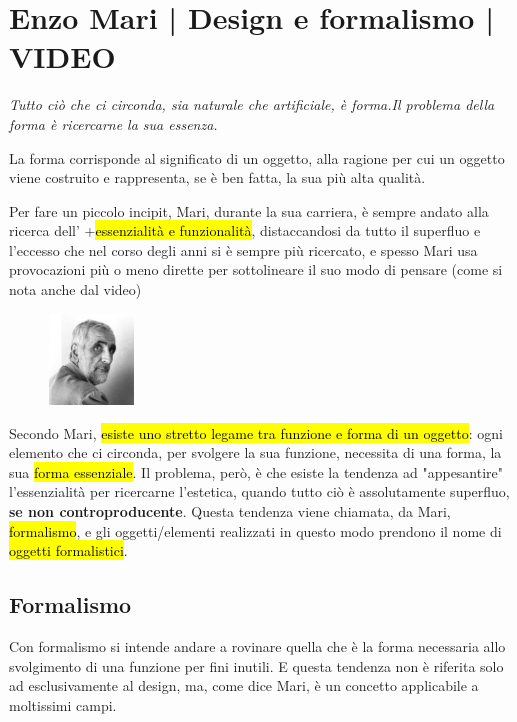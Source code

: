 \section{Enzo Mari | Design e formalismo | VIDEO}\label{sec-mari}
\begin{fancyquotes}
{\huge \textit{Tutto ciò che ci circonda, sia naturale che artificiale, è forma.Il problema della forma è ricercarne la sua essenza.} }

    
    La forma corrisponde al significato di un oggetto, alla ragione per cui un oggetto viene costruito e rappresenta, se è ben fatta, la sua più alta qualità. 
\end{fancyquotes}

Per fare un piccolo incipit, Mari, durante la sua carriera, è sempre andato alla ricerca dell' +\hl{essenzialità e funzionalità}, distaccandosi da tutto il superfluo e l'eccesso che nel corso degli anni si è sempre più ricercato, e spesso Mari usa provocazioni più o meno dirette per sottolineare il suo modo di pensare (come si nota anche dal video)  



\begin{figure} %
    \includegraphics[width=0.2\textwidth]{lezione_1-introduzione al corso/imgs/mari.jpg}
\end{figure}
Secondo Mari, \hl{esiste uno stretto legame tra funzione e forma di un oggetto}: ogni elemento che ci circonda, per svolgere la sua funzione, necessita di una forma, la sua \hl{forma essenziale}.
Il problema, però, è che esiste la tendenza ad "appesantire" l'essenzialità per ricercarne l'estetica, quando tutto ciò è assolutamente superfluo, \textbf{se non controproducente}.
Questa tendenza viene chiamata, da Mari, \hl{formalismo}, e gli oggetti/elementi realizzati in questo modo prendono il nome di  \hl{oggetti formalistici}.\\

\subsection{Formalismo}
Con formalismo si intende andare a rovinare quella che è la forma necessaria allo svolgimento di una funzione per fini inutili. E questa tendenza non è riferita solo ad esclusivamente al design, ma, come dice Mari, è un concetto applicabile a moltissimi campi.

